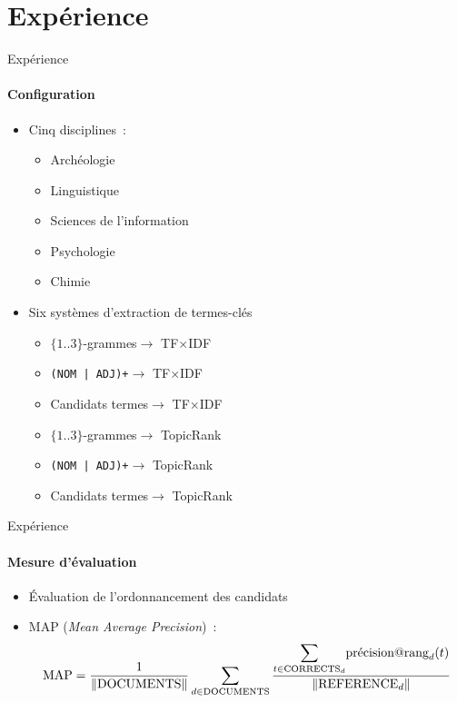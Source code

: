 \section{Expérience}
  \begin{frame}{Expérience}
    \framesubtitle{Configuration}

    \begin{itemize}
      \item{Cinq disciplines~:}
      \begin{itemize}
        \item{Archéologie}
        \item{Linguistique}
        \item{Sciences de l'information}
        \item{Psychologie}
        \item{Chimie}
      \end{itemize}
      \item<2->{Six systèmes d'extraction de termes-clés}
      \begin{itemize}
        \item{$\{1..3\}$-grammes\hfill$\longrightarrow$ TF$\times$IDF\hspace{14.75em}~}
        \item{\texttt{(NOM | ADJ)+}\hfill$\longrightarrow$ TF$\times$IDF\hspace{14.75em}~}
        \item{Candidats termes\hfill$\longrightarrow$ TF$\times$IDF\hspace{14.75em}~}
        \item{$\{1..3\}$-grammes\hfill$\longrightarrow$ TopicRank\hspace{13.915em}~}
        \item{\texttt{(NOM | ADJ)+}\hfill$\longrightarrow$ TopicRank\hspace{13.915em}~}
        \item{Candidats termes\hfill$\longrightarrow$ TopicRank\hspace{13.915em}~}
      \end{itemize}
    \end{itemize}
  \end{frame}

  \begin{frame}[allowframebreaks]{Expérience}
    \framesubtitle{Mesure d'évaluation}

    \begin{itemize}
      \item{Évaluation de l'ordonnancement des candidats}
      \item{MAP (\textit{Mean Average Precision})~:}
      \footnotesize
      \begin{align*}
        \text{MAP} = \frac{1}{\|\text{DOCUMENTS}\|} \sum_{d \in \text{DOCUMENTS}} \frac{\mathlarger\sum_{t \in \text{CORRECTS}_d} \text{précision}@\text{rang}_d(t)}{\|\text{REFERENCE}_d\|}
      \end{align*}
    \end{itemize}
  \end{frame}

